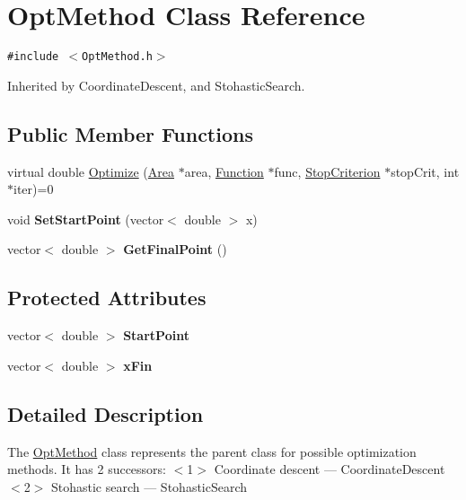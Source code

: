 \hypertarget{class_opt_method}{
\section{OptMethod Class Reference}
\label{class_opt_method}
}
{\tt \#include $<$OptMethod.h$>$}

Inherited by CoordinateDescent, and StohasticSearch.

\subsection*{Public Member Functions}
\begin{CompactItemize}
\item 
virtual double \hyperlink{class_opt_method_870f036f617f136871f438570f67140b}{Optimize} (\hyperlink{class_area}{Area} $\ast$area, \hyperlink{class_function}{Function} $\ast$func, \hyperlink{class_stop_criterion}{StopCriterion} $\ast$stopCrit, int $\ast$iter)=0
\item 
\hypertarget{class_opt_method_0288e3b664e3397c0160e2282db20371}{
void \textbf{SetStartPoint} (vector$<$ double $>$ x)}
\label{class_opt_method_0288e3b664e3397c0160e2282db20371}

\item 
\hypertarget{class_opt_method_84be194e61a1c52956931eaca4cfcf9b}{
vector$<$ double $>$ \textbf{GetFinalPoint} ()}
\label{class_opt_method_84be194e61a1c52956931eaca4cfcf9b}

\end{CompactItemize}
\subsection*{Protected Attributes}
\begin{CompactItemize}
\item 
\hypertarget{class_opt_method_3bc2aacdfea87cf04ab42d1b9ec6c37e}{
vector$<$ double $>$ \textbf{StartPoint}}
\label{class_opt_method_3bc2aacdfea87cf04ab42d1b9ec6c37e}

\item 
\hypertarget{class_opt_method_10c828ff52fd5eabb5f65fc903dd1cda}{
vector$<$ double $>$ \textbf{xFin}}
\label{class_opt_method_10c828ff52fd5eabb5f65fc903dd1cda}

\end{CompactItemize}


\subsection{Detailed Description}
The \hyperlink{class_opt_method}{OptMethod} class represents the parent class for possible optimization methods. It has 2 successors: $<$1$>$ Coordinate descent --- CoordinateDescent $<$2$>$ Stohastic search --- StohasticSearch 

